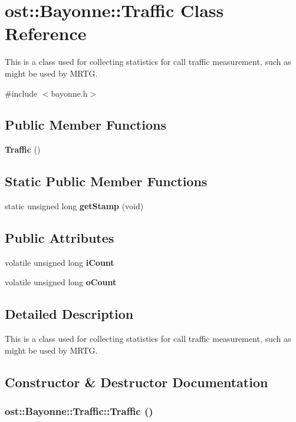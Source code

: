 \section{ost::Bayonne::Traffic Class Reference}
\label{classost_1_1_bayonne_1_1_traffic}


This is a class used for collecting statistics for call traffic measurement, such as might be used by MRTG.  


{\ttfamily \#include $<$bayonne.h$>$}\subsection*{Public Member Functions}
\begin{DoxyCompactItemize}
\item 
{\bf Traffic} ()
\end{DoxyCompactItemize}
\subsection*{Static Public Member Functions}
\begin{DoxyCompactItemize}
\item 
static unsigned long {\bf getStamp} (void)
\end{DoxyCompactItemize}
\subsection*{Public Attributes}
\begin{DoxyCompactItemize}
\item 
volatile unsigned long {\bf iCount}
\item 
volatile unsigned long {\bf oCount}
\end{DoxyCompactItemize}


\subsection{Detailed Description}
This is a class used for collecting statistics for call traffic measurement, such as might be used by MRTG. 

\subsection{Constructor \& Destructor Documentation}
\subsubsection[{Traffic}]{\setlength{\rightskip}{0pt plus 5cm}ost::Bayonne::Traffic::Traffic ()}\label{classost_1_1_bayonne_1_1_traffic_ac4505e2673d0c017f5eedc57736b146b}


